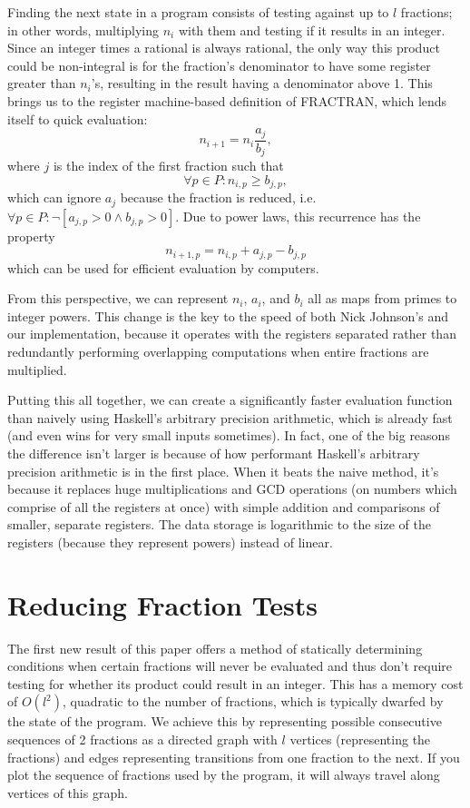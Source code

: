 \documentclass[12pt]{article}
\begin{document}
Finding the next state in a program consists of testing against up to $l$ fractions; in other words, multiplying $n_i$ with them and testing if it results in an integer. Since an integer times a rational is always rational, the only way this product could be non-integral is for the fraction's denominator to have some register greater than $n_i$'s, resulting in the result having a denominator above 1. This brings us to the register machine-based definition of FRACTRAN, which lends itself to quick evaluation:
\[
n_{i+1} = n_i \frac{a_j}{b_j},
\]
where $j$ is the index of the first fraction such that
\[
\forall p \in P : n_{i,p} \geq b_{j,p},
\]
which can ignore $a_j$ because the fraction is reduced, i.e.\ $\forall p \in P : \neg [a_{j,p} > 0 \wedge b_{j,p} > 0]$. Due to power laws, this recurrence has the property
\[
n_{i+1,p} = n_{i,p} + a_{j,p} - b_{j,p}
\]
which can be used for efficient evaluation by computers.

From this perspective, we can represent $n_i$, $a_i$, and $b_i$ all as maps from primes to integer powers. This change is the key to the speed of both Nick Johnson's and our implementation, because it operates with the registers separated rather than redundantly performing overlapping computations when entire fractions are multiplied.

Putting this all together, we can create a significantly faster evaluation function than naively using Haskell's arbitrary precision arithmetic, which is already fast (and even wins for very small inputs sometimes). In fact, one of the big reasons the difference isn't larger is because of how performant Haskell's arbitrary precision arithmetic is in the first place. When it beats the naive method, it's because it replaces huge multiplications and GCD operations (on numbers which comprise of all the registers at once) with simple addition and comparisons of smaller, separate registers. The data storage is logarithmic to the size of the registers (because they represent powers) instead of linear.

\section{Reducing Fraction Tests}

The first new result of this paper offers a method of statically determining conditions when certain fractions will never be evaluated and thus don't require testing for whether its product could result in an integer. This has a memory cost of $O(l^2)$, quadratic to the number of fractions, which is typically dwarfed by the state of the program. We achieve this by representing possible consecutive sequences of 2 fractions as a directed graph with $l$ vertices (representing the fractions) and edges representing transitions from one fraction to the next. If you plot the sequence of fractions used by the program, it will always travel along vertices of this graph.
\end{document}
